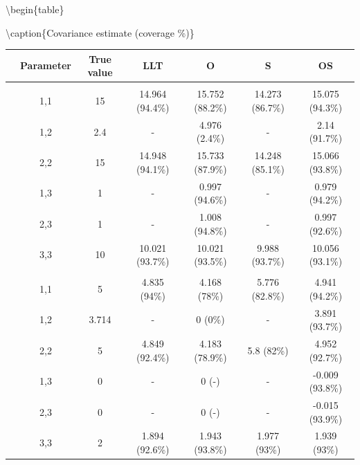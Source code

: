 \documentclass[
]{article}
\begin{document}
\textbackslash begin\{table\}

\textbackslash caption\{\label{tab:unnamed-chunk-31}Covariance estimate (coverage \%)\}
\centering

\begin{tabular}[t]{ccccccc}
\toprule
 & Parameter & True value & LLT & O & S & OS\\
\midrule
\addlinespace[0.3em]
\multicolumn{7}{l}{\textbf{Observation Error}}\\
\hspace{1em} & 1,1 & 15 & 14.964 (94.4\%) & 15.752 (88.2\%) & 14.273 (86.7\%) & 15.075 (94.3\%)\\
\cmidrule{2-7}
\hspace{1em} & 1,2 & 2.4 & - & 4.976 (2.4\%) & - & 2.14 (91.7\%)\\
\cmidrule{2-7}
\hspace{1em} & 2,2 & 15 & 14.948 (94.1\%) & 15.733 (87.9\%) & 14.248 (85.1\%) & 15.066 (93.8\%)\\
\cmidrule{2-7}
\hspace{1em} & 1,3 & 1 & - & 0.997 (94.6\%) & - & 0.979 (94.2\%)\\
\cmidrule{2-7}
\hspace{1em} & 2,3 & 1 & - & 1.008 (94.8\%) & - & 0.997 (92.6\%)\\
\cmidrule{2-7}
\hspace{1em} & 3,3 & 10 & 10.021 (93.7\%) & 10.021 (93.5\%) & 9.988 (93.7\%) & 10.056 (93.1\%)\\
\cmidrule{1-7}
\addlinespace[0.3em]
\multicolumn{7}{l}{\textbf{State Process}}\\
\hspace{1em} & 1,1 & 5 & 4.835 (94\%) & 4.168 (78\%) & 5.776 (82.8\%) & 4.941 (94.2\%)\\
\cmidrule{2-7}
\hspace{1em} & 1,2 & 3.714 & - & 0 (0\%) & - & 3.891 (93.7\%)\\
\cmidrule{2-7}
\hspace{1em} & 2,2 & 5 & 4.849 (92.4\%) & 4.183 (78.9\%) & 5.8 (82\%) & 4.952 (92.7\%)\\
\cmidrule{2-7}
\hspace{1em} & 1,3 & 0 & - & 0 (-) & - & -0.009 (93.8\%)\\
\cmidrule{2-7}
\hspace{1em} & 2,3 & 0 & - & 0 (-) & - & -0.015 (93.9\%)\\
\cmidrule{2-7}
\hspace{1em} & 3,3 & 2 & 1.894 (92.6\%) & 1.943 (93.8\%) & 1.977 (93\%) & 1.939 (93\%)\\
\bottomrule
\end{tabular}
\end{document}
